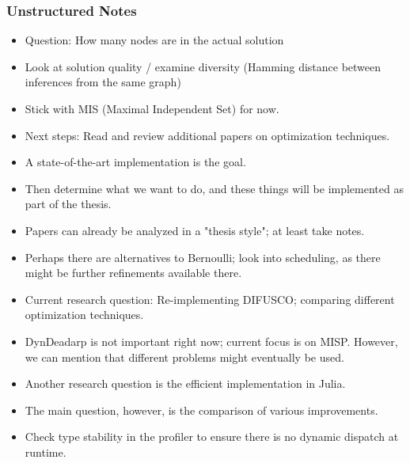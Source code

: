 \subsubsection{Unstructured Notes}
\begin{itemize}
    \item Question: How many nodes are in the actual solution
    \item Look at solution quality / examine diversity (Hamming distance between inferences from the same graph)
    \item Stick with MIS (Maximal Independent Set) for now.
    \item Next steps: Read and review additional papers on optimization techniques.
    \item A state-of-the-art implementation is the goal.
    \item Then determine what we want to do, and these things will be implemented as part of the thesis.
    \item Papers can already be analyzed in a "thesis style"; at least take notes.
    \item Perhaps there are alternatives to Bernoulli; look into scheduling, as there might be further refinements available there.
    \item Current research question: Re-implementing DIFUSCO; comparing different optimization techniques.
    \item DynDeadarp is not important right now; current focus is on MISP. However, we can mention that different problems might eventually be used.
    \item Another research question is the efficient implementation in Julia.
    \item The main question, however, is the comparison of various improvements.
    \item Check type stability in the profiler to ensure there is no dynamic dispatch at runtime.
\end{itemize}